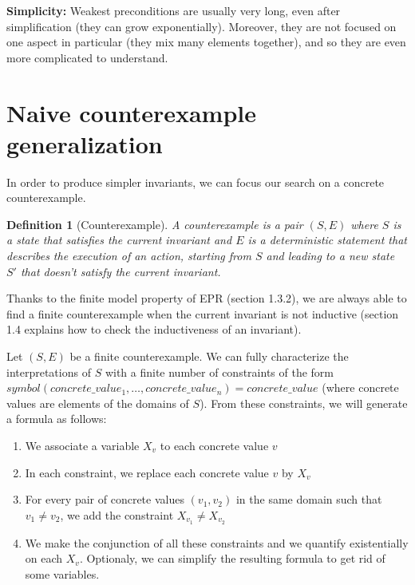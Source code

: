 \documentclass[11pt,a4paper,oldfontcommands,openany]{memoir}
\newtheorem*{definition}{Definition}
\begin{document}
    \textbf{Simplicity:} Weakest preconditions are usually very long, even after simplification (they can grow exponentially).
    Moreover, they are not focused on one aspect in particular (they mix many elements together), and so they are even more complicated
    to understand.

    \section{Naive counterexample generalization}

    In order to produce simpler invariants, we can focus our search on a concrete counterexample.

    \begin{definition}[Counterexample]
    A counterexample is a pair \( (S,E) \) where \(S\) is a state that satisfies the current invariant and \(E\) is a deterministic statement that describes the execution of an action,
    starting from \(S\) and leading to a new state \(S'\) that doesn't satisfy the current invariant.
    \end{definition}
    Thanks to the finite model property of EPR (section 1.3.2), we are always able to find a finite counterexample when the current invariant is not inductive
    (section 1.4 explains how to check the inductiveness of an invariant).

    Let \( (S,E) \) be a finite counterexample.
    We can fully characterize the interpretations of \(S\) with a finite number of constraints of the form \(symbol(concrete\_value_1,\ldots,concrete\_value_n) = concrete\_value\)
    (where concrete values are elements of the domains of \(S\)).
    From these constraints, we will generate a formula as follows:
    \begin{enumerate}
        \item We associate a variable \( X_v \) to each concrete value \(v\)
        \item In each constraint, we replace each concrete value \(v\) by \( X_v \)
        \item For every pair of concrete values \( (v_1,v_2) \) in the same domain such that \( v_1 \neq v_2 \), we add the constraint \( X_{v_1} \neq X_{v_2} \)
        \item We make the conjunction of all these constraints and we quantify existentially on each \(X_v\). Optionaly, we can simplify the resulting formula to get rid of some variables.
    \end{enumerate}
    
\end{document}
